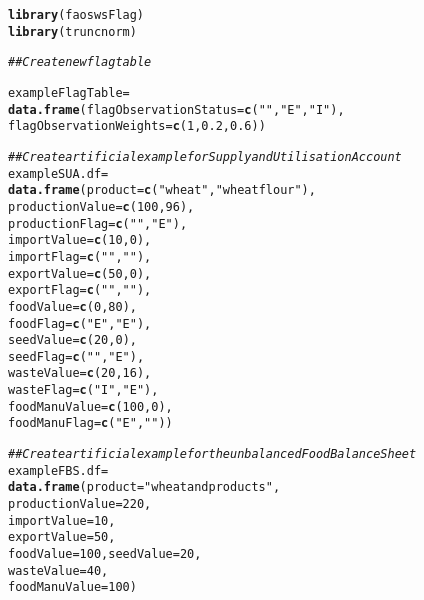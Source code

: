 \documentclass[nojss]{jss}\usepackage[]{graphicx}\usepackage[]{color}
\makeatletter
\newcommand{\hlnum}[1]{\textcolor[rgb]{0.686,0.059,0.569}{#1}}%
\newcommand{\hlstr}[1]{\textcolor[rgb]{0.192,0.494,0.8}{#1}}%
\newcommand{\hlcom}[1]{\textcolor[rgb]{0.678,0.584,0.686}{\textit{#1}}}%
\newcommand{\hlstd}[1]{\textcolor[rgb]{0.345,0.345,0.345}{#1}}%
\newcommand{\hlkwb}[1]{\textcolor[rgb]{0.69,0.353,0.396}{#1}}%
\newcommand{\hlkwc}[1]{\textcolor[rgb]{0.333,0.667,0.333}{#1}}%
\newcommand{\hlkwd}[1]{\textcolor[rgb]{0.737,0.353,0.396}{\textbf{#1}}}%
\newenvironment{kframe}{%
 \def\at@end@of@kframe{}%
 \ifinner\ifhmode%
  \def\at@end@of@kframe{\end{minipage}}%
  \begin{minipage}{\columnwidth}%
 \fi\fi%
 \def\FrameCommand##1{\hskip\@totalleftmargin \hskip-\fboxsep
 \colorbox{shadecolor}{##1}\hskip-\fboxsep
     \hskip-\linewidth \hskip-\@totalleftmargin \hskip\columnwidth}%
 \MakeFramed {\advance\hsize-\width
   \@totalleftmargin\z@ \linewidth\hsize
   \@setminipage}}%
 {\par\unskip\endMakeFramed%
 \at@end@of@kframe}
\newenvironment{knitrout}{}{} %
\makeatother
\begin{document}
\begin{knitrout}
\color{fgcolor}\begin{kframe}
\begin{alltt}
\hlkwd{library}\hlstd{(faoswsFlag)}
\hlkwd{library}\hlstd{(truncnorm)}

\hlcom{## Create new flag table}

\hlstd{exampleFlagTable} \hlkwb{=}
    \hlkwd{data.frame}\hlstd{(}\hlkwc{flagObservationStatus} \hlstd{=} \hlkwd{c}\hlstd{(}\hlstr{""}\hlstd{,} \hlstr{"E"}\hlstd{,} \hlstr{"I"}\hlstd{),}
               \hlkwc{flagObservationWeights} \hlstd{=} \hlkwd{c}\hlstd{(}\hlnum{1}\hlstd{,} \hlnum{0.2}\hlstd{,} \hlnum{0.6}\hlstd{))}

\hlcom{## Create artificial example for Supply and Utilisation Account}
\hlstd{exampleSUA.df} \hlkwb{=}
    \hlkwd{data.frame}\hlstd{(}\hlkwc{product} \hlstd{=} \hlkwd{c}\hlstd{(}\hlstr{"wheat"}\hlstd{,} \hlstr{"wheat flour"}\hlstd{),}
               \hlkwc{productionValue} \hlstd{=} \hlkwd{c}\hlstd{(}\hlnum{100}\hlstd{,} \hlnum{96}\hlstd{),}
               \hlkwc{productionFlag} \hlstd{=} \hlkwd{c}\hlstd{(}\hlstr{""}\hlstd{,} \hlstr{"E"}\hlstd{),}
               \hlkwc{importValue} \hlstd{=} \hlkwd{c}\hlstd{(}\hlnum{10}\hlstd{,} \hlnum{0}\hlstd{),}
               \hlkwc{importFlag} \hlstd{=} \hlkwd{c}\hlstd{(}\hlstr{""}\hlstd{,} \hlstr{""}\hlstd{),}
               \hlkwc{exportValue} \hlstd{=} \hlkwd{c}\hlstd{(}\hlnum{50}\hlstd{,} \hlnum{0}\hlstd{),}
               \hlkwc{exportFlag} \hlstd{=} \hlkwd{c}\hlstd{(}\hlstr{""}\hlstd{,} \hlstr{""}\hlstd{),}
               \hlkwc{foodValue} \hlstd{=} \hlkwd{c}\hlstd{(}\hlnum{0}\hlstd{,} \hlnum{80}\hlstd{),}
               \hlkwc{foodFlag} \hlstd{=} \hlkwd{c}\hlstd{(}\hlstr{"E"}\hlstd{,} \hlstr{"E"}\hlstd{),}
               \hlkwc{seedValue} \hlstd{=} \hlkwd{c}\hlstd{(}\hlnum{20}\hlstd{,} \hlnum{0}\hlstd{),}
               \hlkwc{seedFlag} \hlstd{=} \hlkwd{c}\hlstd{(}\hlstr{""}\hlstd{,} \hlstr{"E"}\hlstd{),}
               \hlkwc{wasteValue} \hlstd{=} \hlkwd{c}\hlstd{(}\hlnum{20}\hlstd{,} \hlnum{16}\hlstd{),}
               \hlkwc{wasteFlag} \hlstd{=} \hlkwd{c}\hlstd{(}\hlstr{"I"}\hlstd{,} \hlstr{"E"}\hlstd{),}
               \hlkwc{foodManuValue} \hlstd{=} \hlkwd{c}\hlstd{(}\hlnum{100}\hlstd{,} \hlnum{0}\hlstd{),}
               \hlkwc{foodManuFlag} \hlstd{=} \hlkwd{c}\hlstd{(}\hlstr{"E"}\hlstd{,} \hlstr{""}\hlstd{))}

\hlcom{## Create artificial example for the unbalanced Food Balance Sheet}
\hlstd{exampleFBS.df} \hlkwb{=}
    \hlkwd{data.frame}\hlstd{(}\hlkwc{product} \hlstd{=} \hlstr{"wheat and products"}\hlstd{,}
               \hlkwc{productionValue} \hlstd{=} \hlnum{220}\hlstd{,}
               \hlkwc{importValue} \hlstd{=} \hlnum{10}\hlstd{,}
               \hlkwc{exportValue} \hlstd{=} \hlnum{50}\hlstd{,}
               \hlkwc{foodValue} \hlstd{=} \hlnum{100}\hlstd{,} \hlkwc{seedValue} \hlstd{=} \hlnum{20}\hlstd{,}
               \hlkwc{wasteValue} \hlstd{=} \hlnum{40}\hlstd{,}
               \hlkwc{foodManuValue} \hlstd{=} \hlnum{100}\hlstd{)}
\end{alltt}
\end{kframe}
\end{knitrout}
\end{document}
